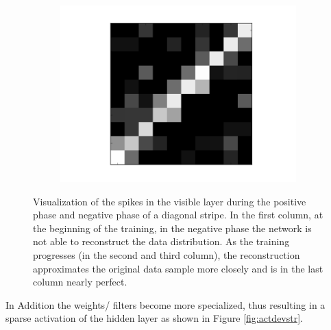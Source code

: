 \begin{figure}[h!]
\begin{subfigure}{.25\textwidth}
  		\label{fig:sub1}
	\end{subfigure}%
	\begin{subfigure}{.25\textwidth}
  		\centering
  		\includegraphics[width=0.8\linewidth]{imgs/reconst/00008.png}
  		\label{fig:sub1}
	\end{subfigure}%
	\caption[Visualization of the spikes in the visible layer during the positive phase and negative phase of a diagonal stripe.]{Visualization of the spikes in the visible layer during the positive phase and negative phase of a diagonal stripe. In the first column, at the beginning of the training, in the negative phase the network is not able to reconstruct the data distribution. As the training progresses (in the second and third column), the reconstruction approximates the original data sample more closely and is in the last column nearly perfect.}
	\label{fig:posnegstrec}
\end{figure}

In Addition the weights/ filters become more specialized, thus resulting in a sparse activation of the hidden layer as shown in Figure \ref{fig:actdevstr}.  

